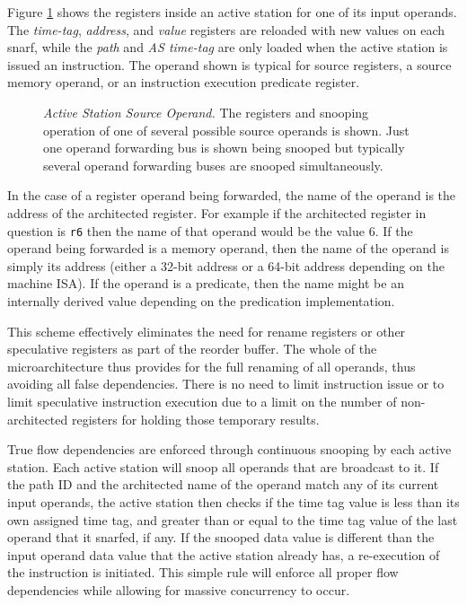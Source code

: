 \documentclass[10pt,twocolumn,dvips]{article}
\begin{document}
Figure \ref{fig:source} shows the registers inside an active
station for one of its input operands.  The 
{\em time-tag},
{\em address}, and
{\em value} registers are reloaded with new values on each snarf,
while the
{\em path} and
{\em AS time-tag} are only loaded when the active station is
issued an instruction.
The operand shown is typical for source registers, a source memory
operand, or an instruction execution predicate register.
\begin{figure}
\centering
{}
\caption{{\em Active Station Source Operand.} The registers and snooping
operation of one of several possible source operands is shown.
Just one operand forwarding bus is shown being snooped but
typically several operand forwarding buses are snooped simultaneously.}
\label{fig:source}
\end{figure}
In the case of a register operand being forwarded, the name of the
operand is the address of the architected register.  For example
if the architected register in question is {\tt r6} then the
name of that operand would be the value 6.  If the operand
being forwarded is a memory operand, then the name of the operand
is simply its address (either a 32-bit address or a 64-bit address
depending on the machine ISA).  If the operand is a predicate,
then the name might be an internally derived value depending on
the predication implementation. 

This scheme effectively eliminates the need for rename registers
or other speculative registers as part of the reorder buffer.
The whole of the microarchitecture thus provides for the full renaming
of all operands, thus avoiding all false dependencies.
There is no need to limit instruction issue or to limit speculative
instruction execution due to a limit on the number of non-architected
registers for holding those temporary results.

True flow dependencies are enforced through continuous  
snooping by each active station.  Each active station
will snoop all operands that are broadcast to it.  If the
path ID and the architected name of the operand match any of
its current input operands, the active station then checks
if the time tag value is less than its own assigned time tag,
and greater than or equal to the time tag value of the last
operand that it snarfed, if any.  If the snooped data value is
different than the input operand data value that the active
station already has, a re-execution of the instruction is initiated.
This simple rule will enforce
all proper flow dependencies while allowing for massive
concurrency to occur.
\vspace{-0.2in}
\end{document}
